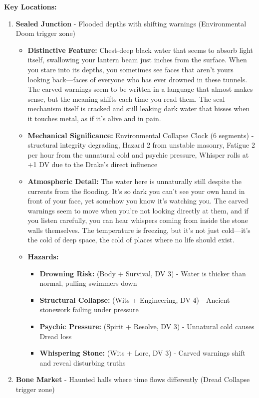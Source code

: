 \documentclass[11pt]{article}
\begin{document}
\textbf{Key Locations:}
\begin{enumerate}
\item \textbf{Sealed Junction} - Flooded depths with shifting warnings (Environmental Doom trigger zone)
  \begin{itemize}
  \item \textbf{Distinctive Feature:} Chest-deep black water that seems to absorb light itself, swallowing your lantern beam just inches from the surface. When you stare into its depths, you sometimes see faces that aren't yours looking back—faces of everyone who has ever drowned in these tunnels. The carved warnings seem to be written in a language that almost makes sense, but the meaning shifts each time you read them. The seal mechanism itself is cracked and still leaking dark water that hisses when it touches metal, as if it's alive and in pain.
  \item \textbf{Mechanical Significance:} Environmental Collapse Clock (6 segments) - structural integrity degrading, Hazard 2 from unstable masonry, Fatigue 2 per hour from the unnatural cold and psychic pressure, Whisper rolls at +1 DV due to the Drake's direct influence
  \item \textbf{Atmospheric Detail:} The water here is unnaturally still despite the currents from the flooding. It's so dark you can't see your own hand in front of your face, yet somehow you know it's watching you. The carved warnings seem to move when you're not looking directly at them, and if you listen carefully, you can hear whispers coming from inside the stone walls themselves. The temperature is freezing, but it's not just cold—it's the cold of deep space, the cold of places where no life should exist.
  \item \textbf{Hazards:}
    \begin{itemize}
    \item \textbf{Drowning Risk:} (Body + Survival, DV 3) - Water is thicker than normal, pulling swimmers down
    \item \textbf{Structural Collapse:} (Wits + Engineering, DV 4) - Ancient stonework failing under pressure
    \item \textbf{Psychic Pressure:} (Spirit + Resolve, DV 3) - Unnatural cold causes Dread loss
    \item \textbf{Whispering Stone:} (Wits + Lore, DV 3) - Carved warnings shift and reveal disturbing truths
    \end{itemize}
  \end{itemize}
\item \textbf{Bone Market} - Haunted halls where time flows differently (Dread Collapse trigger zone)

\end{enumerate}
\end{document}
